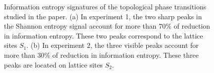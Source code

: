 \documentclass[fleqn,10pt]{wlscirep}
\begin{document}
\begin{figure}
\centering
{}\quad
{}\quad
\caption{Information entropy signatures of the topological phase transitions studied in the paper. (a) In experiment 1, the two sharp peaks in the Shannon entropy signal account for more than 70\% of reduction in information entropy. These two peaks correspond to the lattice sites $S_1$. (b) In experiment 2, the three visible peaks account for more than 30\% of reduction in information entropy. These three peaks are located on lattice sites $S_2$.}
\label{feature_importances}
\end{figure}
\end{document}

